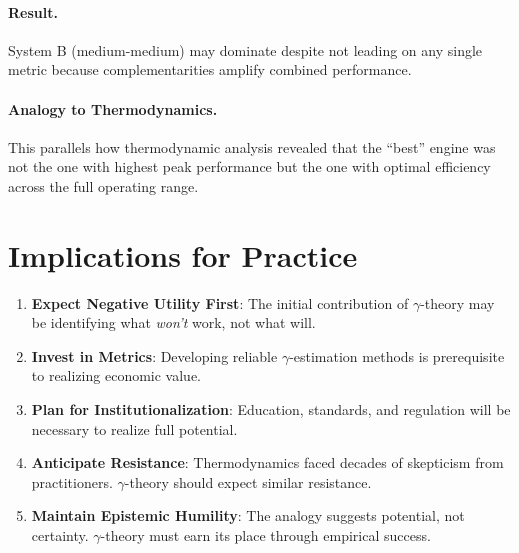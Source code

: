 \paragraph{Result.} System B (medium-medium) may dominate despite not leading
on any single metric because complementarities amplify combined performance.

\paragraph{Analogy to Thermodynamics.} This parallels how thermodynamic analysis
revealed that the ``best'' engine was not the one with highest peak performance
but the one with optimal efficiency across the full operating range.


\section{Implications for Practice}
\label{sec:thermo-practice}

\begin{tcolorbox}[colback=green!5!white, colframe=green!75!black,
    title=Practical Implications]
\begin{enumerate}
\item \textbf{Expect Negative Utility First}: The initial contribution of
$\gamma$-theory may be identifying what \textit{won't} work, not what will.

\item \textbf{Invest in Metrics}: Developing reliable $\gamma$-estimation
methods is prerequisite to realizing economic value.

\item \textbf{Plan for Institutionalization}: Education, standards, and
regulation will be necessary to realize full potential.

\item \textbf{Anticipate Resistance}: Thermodynamics faced decades of
skepticism from practitioners. $\gamma$-theory should expect similar resistance.

\item \textbf{Maintain Epistemic Humility}: The analogy suggests potential,
not certainty. $\gamma$-theory must earn its place through empirical success.
\end{enumerate}
\end{tcolorbox}


